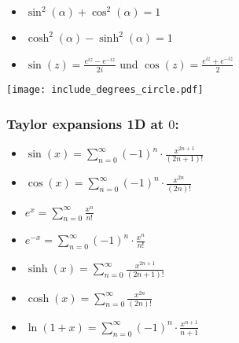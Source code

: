 \documentclass[a4paper,fontsize = 10pt]{article}
\def\sumn{\sum_{n=0}^\infty}
\begin{document}
\begin{itemize}
 \item $\sin^2(\alpha) + \cos^2(\alpha) = 1$
 \item $\cosh^2(\alpha) - \sinh^2(\alpha) = 1$
 \item $\sin(z) = \frac{e^{iz} - e^{-iz}}{2i}$ und $\cos(z) = \frac{e^{iz} + e^{-iz}}{2}$
\end{itemize}

\begingroup
\renewcommand*{\arraystretch}{2}


\begin{center}
  \texttt{[image: include\_degrees\_circle.pdf]}
  
\end{center}

\subsubsection*{Taylor expansions 1D at $0$:}
\begin{itemize}
 \item $\sin(x) = \sumn (-1)^n \cdot \frac{x^{2n+1}}{(2n+1)!}$
 \item $\cos(x) = \sumn (-1)^n \cdot \frac{x^{2n}}{(2n)!}$
 \item $e^x = \sumn \frac{x^n}{n!}$
 \item $e^{-x} = \sumn (-1)^n \cdot \frac{x^n}{n!}$
 \item $\sinh(x) = \sumn \frac{x^{2n+1}}{(2n+1)!}$
 \item $\cosh(x) = \sumn \frac{x^{2n}}{(2n)!}$
 \item $\ln(1+x) = \sumn  (-1)^n \cdot \frac{x^{n+1}}{n+1}$
\end{itemize}
\end{document}
